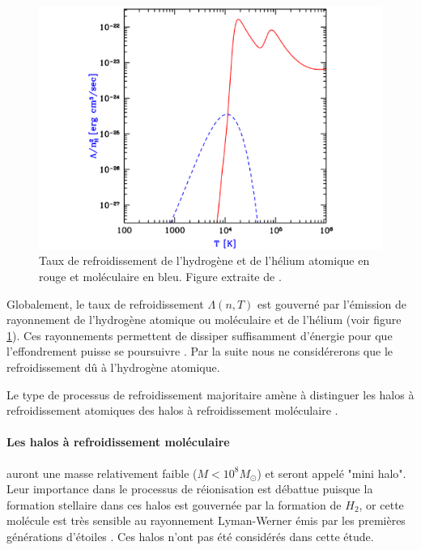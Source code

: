 \begin{figure}
        \includegraphics[width=.95\linewidth]{img/01/fonction_refroidissement.pdf} 
        \caption[Fonction de refroidissement]{Taux de refroidissement de l'hydrogène et de l'hélium atomique en rouge et moléculaire en bleu. 
        Figure extraite de \cite{2016PhR...645....1B}.
 		\label{fig:refroidissement}}
\end{figure}

Globalement, le taux de refroidissement $\Lambda(n,T)$ est gouverné par l'émission de rayonnement de l'hydrogène atomique ou moléculaire et de l’hélium (voir figure \ref{fig:refroidissement}).
Ces rayonnements permettent de dissiper suffisamment d'énergie pour que l'effondrement puisse se poursuivre \citep{2001PhR...349..125B}.
Par la suite nous ne considérerons que le refroidissement dû à l'hydrogène atomique.

Le type de processus de refroidissement majoritaire amène à distinguer les halos à refroidissement atomiques des halos à refroidissement moléculaire \citep{2002Sci...295...93A}.

\paragraph{Les halos à refroidissement moléculaire} auront une masse relativement faible ($M < 10^8 M_\odot$) et seront appelé "mini halo".
Leur importance dans le processus de réionisation est débattue \citep{2012ApJ...756L..16A} puisque la formation stellaire dans ces halos est gouvernée par la formation de $H_2$, or cette molécule est très sensible au rayonnement Lyman-Werner émis par les premières générations d'étoiles \citep{2002ApJ...575...49R}.
Ces halos n'ont pas été considérés dans cette étude.


